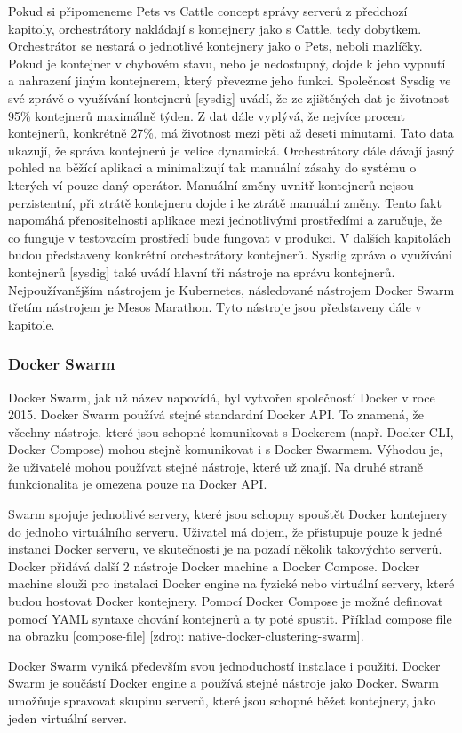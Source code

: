     Pokud si připomeneme Pets vs Cattle concept správy serverů z předchozí kapitoly, orchestrátory nakládají s kontejnery jako s Cattle, tedy dobytkem. Orchestrátor se nestará o jednotlivé kontejnery jako o Pets, neboli mazlíčky. Pokud je kontejner v chybovém stavu, nebo je nedostupný, dojde k jeho vypnutí a nahrazení jiným kontejnerem, který převezme jeho funkci. Společnost Sysdig ve své zprávě o využívání kontejnerů [sysdig] uvádí, že ze zjištěných dat je životnost 95\% kontejnerů maximálně týden. Z dat dále vyplývá, že nejvíce procent kontejnerů, konkrétně 27\%,  má životnost mezi pěti až deseti minutami. Tato data ukazují, že správa kontejnerů je velice dynamická. Orchestrátory dále dávají jasný pohled na běžící aplikaci a minimalizují tak manuální zásahy do systému o kterých ví pouze daný operátor. Manuální změny uvnitř kontejnerů nejsou perzistentní, při ztrátě kontejneru dojde i ke ztrátě manuální změny. Tento fakt napomáhá přenositelnosti aplikace mezi jednotlivými prostředími a zaručuje, že co funguje v testovacím prostředí bude fungovat v produkci. V dalších kapitolách budou představeny konkrétní orchestrátory kontejnerů. Sysdig zpráva o využívání kontejnerů [sysdig] také uvádí hlavní tři nástroje na správu kontejnerů. Nejpoužívanějším nástrojem je Kubernetes, následované nástrojem Docker Swarm třetím nástrojem je Mesos Marathon. Tyto nástroje jsou představeny dále v kapitole.

 \subsubsection{Docker Swarm}
 Docker Swarm, jak už název napovídá, byl vytvořen společností Docker v roce 2015. Docker Swarm používá stejné standardní Docker API. To znamená, že všechny nástroje, které jsou schopné komunikovat s Dockerem (např. Docker CLI, Docker Compose) mohou stejně komunikovat i s Docker Swarmem. Výhodou je, že uživatelé mohou používat stejné nástroje, které už znají. Na druhé straně funkcionalita je omezena pouze na Docker API. \par
     Swarm spojuje jednotlivé servery, které jsou schopny spouštět Docker kontejnery do jednoho virtuálního serveru. Uživatel má dojem, že přistupuje pouze k jedné instanci Docker serveru, ve skutečnosti je na pozadí několik takovýchto serverů. Docker přidává další 2 nástroje Docker machine a Docker Compose. Docker machine slouži pro instalaci Docker engine na fyzické nebo virtuální servery, které budou hostovat Docker kontejnery. Pomocí Docker Compose je možné definovat pomocí YAML syntaxe chování kontejnerů a ty poté spustit. Příklad compose file na obrazku [compose-file] [zdroj: native-docker-clustering-swarm].\par
         Docker Swarm vyniká především svou jednoduchostí instalace i použití. Docker Swarm je součástí Docker engine a používá stejné nástroje jako Docker. Swarm umožňuje spravovat skupinu serverů, které jsou schopné běžet kontejnery, jako jeden virtuální server.
